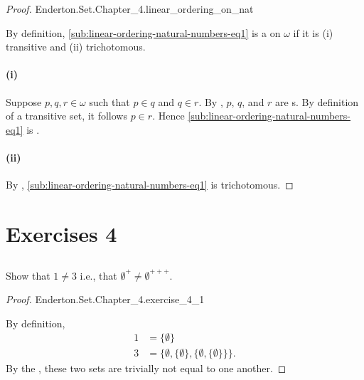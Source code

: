\documentclass{report}
\begin{document}
\begin{proof}

    {Enderton.Set.Chapter\_4.linear\_ordering\_on\_nat}

  By definition, \eqref{sub:linear-ordering-natural-numbers-eq1} is a
     on $\omega$ if it is (i) transitive and
    (ii) trichotomous.

  \paragraph{(i)}%

    Suppose $p, q, r \in \omega$ such that $p \in q$ and $q \in r$.
    By , $p$, $q$, and $r$ are
      s.
    By definition of a transitive set, it follows $p \in r$.
    Hence \eqref{sub:linear-ordering-natural-numbers-eq1} is
      .

  \paragraph{(ii)}%

    By ,
      \eqref{sub:linear-ordering-natural-numbers-eq1} is trichotomous.

\end{proof}

\section{Exercises 4}%

\subsection{}%

Show that $1 \neq 3$ i.e., that $\emptyset^+ \neq \emptyset^{+++}$.

\begin{proof}

    {Enderton.Set.Chapter\_4.exercise\_4\_1}

  By definition,
    \begin{align*}
      1 & = \{\emptyset\} \\
      3 & = \{\emptyset, \{\emptyset\}, \{\emptyset, \{\emptyset\}\}\}.
    \end{align*}
  By the , these two sets are trivially not
    equal to one another.

\end{proof}
\end{document}
